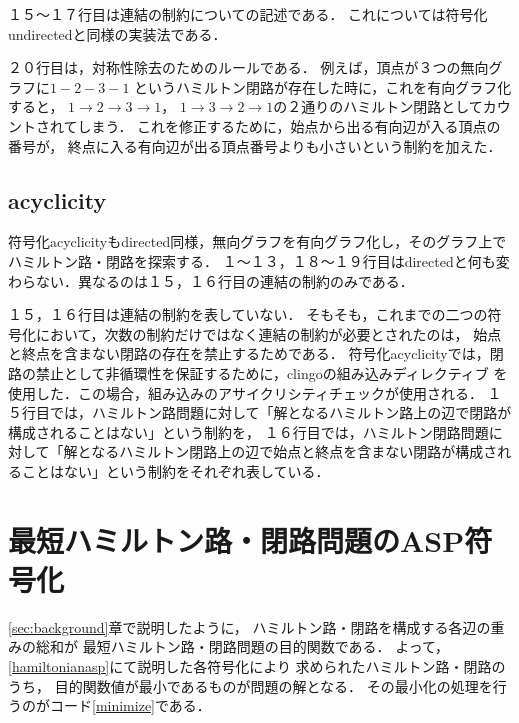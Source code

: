 １５〜１７行目は連結の制約についての記述である．
これについては符号化undirectedと同様の実装法である．

２０行目は，対称性除去のためのルールである．
例えば，頂点が３つの無向グラフに$1 - 2 - 3 - 1$
というハミルトン閉路が存在した時に，これを有向グラフ化すると，
$1 \rightarrow 2 \rightarrow 3 \rightarrow 1$，
$1 \rightarrow 3 \rightarrow 2 \rightarrow 1$の２通りのハミルトン閉路としてカウントされてしまう．
これを修正するために，始点から出る有向辺が入る頂点の番号が，
終点に入る有向辺が出る頂点番号よりも小さいという制約を加えた．
\newpage
\subsection{acyclicity}

符号化acyclicityもdirected同様，無向グラフを有向グラフ化し，そのグラフ上でハミルトン路・閉路を探索する．
１〜１３，１８〜１９行目はdirectedと何も変わらない．異なるのは１５，１６行目の連結の制約のみである．

１５，１６行目は連結の制約を表していない．
そもそも，これまでの二つの符号化において，次数の制約だけではなく連結の制約が必要とされたのは，
始点と終点を含まない閉路の存在を禁止するためである．
符号化acyclicityでは，閉路の禁止として非循環性を保証するために，clingoの組み込みディレクティブ\cite{gebser2016}
を使用した．この場合，組み込みのアサイクリシティチェック\cite{bomanson2016}が使用される．\cite{dimopoulos2018}
１５行目では，ハミルトン路問題に対して「解となるハミルトン路上の辺で閉路が構成されることはない」という制約を，
１６行目では，ハミルトン閉路問題に対して「解となるハミルトン閉路上の辺で始点と終点を含まない閉路が構成されることはない」という制約をそれぞれ表している．
\section{最短ハミルトン路・閉路問題のASP符号化}\label{minexpl}

\ref{sec:background}章で説明したように，
ハミルトン路・閉路を構成する各辺の重みの総和が
最短ハミルトン路・閉路問題の目的関数である．
よって，\ref{hamiltonianasp}にて説明した各符号化により
求められたハミルトン路・閉路のうち，
目的関数値が最小であるものが問題の解となる．
その最小化の処理を行うのがコード\ref{minimize}である．

